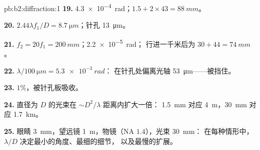 \begin{solution}{pb:b2:diffraction:1}
\textbf{19.} \qty{4.3e-4}{rad}；$1.5 + 2 \times 43 = \qty{88}{mm}$。

\textbf{20.} $2.44\lambda f_1/D = \qty{8.7}{\micro m}$；针孔 \qty{13}{\micro m}。

\textbf{21.} $f_2 = 20f_1 = \qty{200}{mm}$；\qty{2.2e-5}{rad}；
行进一千米后为 $30 + 44 = \qty{74}{mm}$。

\textbf{22.} $\lambda/\qty{100}{\micro m} = \qty{5.3e-3}{rad}$：
在针孔处偏离光轴 \qty{53}{\micro m}——被挡住。

\textbf{23.} $1\%$，被针孔板吸收。

\textbf{24.} 直径为 $D$ 的光束在 $\sim D^2/\lambda$ 距离内扩大一倍：
\qty{1.5}{mm} 对应 \qty{4}{m}，\qty{30}{mm} 对应 \qty{1.7}{km}。

\textbf{25.} 眼睛 \qty{3}{mm}，望远镜 \qty{1}{m}，物镜（NA $1.4$），光束 \qty{30}{mm}：
在每种情形中，$\lambda/D$ 决定最小的角度、最细的细节，
以及最慢的扩展。
\end{solution}
